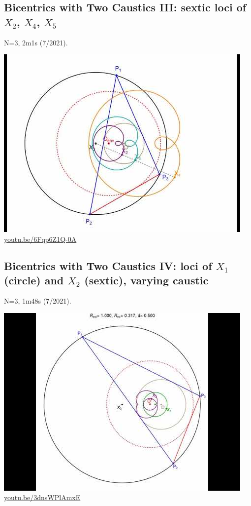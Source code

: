 \documentclass[12pt]{amsart}
\begin{document}
\subsection{Bicentrics with Two Caustics III: sextic loci of $X_{2}$, $X_{4}$, $X_{5}$}
\label{vid:6Fqp6Z1Q-0A}
\noindent N=3, 2m1s (7/2021). 
\begin{center}\includegraphics[width=.5\textwidth]{pics/6Fqp6Z1Q-0A.jpg} \\ 
\href{https://youtu.be/6Fqp6Z1Q-0A}{\url{youtu.be/6Fqp6Z1Q-0A}}\end{center}
% 
\subsection{Bicentrics with Two Caustics IV: loci of $X_{1}$ (circle) and $X_{2}$ (sextic), varying caustic}
\label{vid:3dnsWPlAmxE}
\noindent N=3, 1m48s (7/2021). 
\begin{center}\includegraphics[width=.5\textwidth]{pics/3dnsWPlAmxE.jpg} \\ 
\href{https://youtu.be/3dnsWPlAmxE}{\url{youtu.be/3dnsWPlAmxE}}\end{center}
% 
\end{document}
